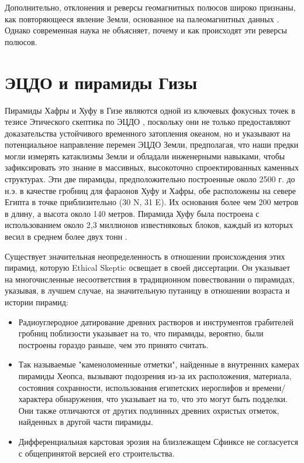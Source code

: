 \documentclass[10pt,twocolumn,letterpaper]{article}
\begin{document}
Дополнительно, отклонения и реверсы геомагнитных полюсов широко признаны, как повторяющееся явление Земли, основанное на палеомагнитных данных \cite{35,40,41}. Однако современная наука не объясняет, почему и как происходят эти реверсы полюсов.

\section{ЭЦДО и пирамиды Гизы}

Пирамиды Хафры и Хуфу в Гизе являются одной из ключевых фокусных точек в тезисе Этического скептика по ЭЦДО \cite{27}, поскольку они не только предоставляют доказательства устойчивого временного затопления океаном, но и указывают на потенциальное направление перемен ЭЦДО Земли, предполагая, что наши предки могли измерять катаклизмы Земли и обладали инженерными навыками, чтобы зафиксировать это знание в массивных, высокоточно спроектированных каменных структурах. Эти две пирамиды, предположительно построенные около 2500 г. до н.э. в качестве гробниц для фараонов Хуфу и Хафры, обе расположены на севере Египта в точке приблизительно (30 N, 31 E). Их основания более чем 200 метров в длину, а высота около 140 метров. Пирамида Хуфу была построена с использованием около 2,3 миллионов известняковых блоков, каждый из которых весил в среднем более двух тонн \cite{24, 25}.

Существует значительная неопределенность в отношении происхождения этих пирамид, которую Ethical Skeptic освещает в своей диссертации. Он указывает на многочисленные несоответствия в традиционном повествовании о пирамидах, указывая, в лучшем случае, на значительную путаницу в отношении возраста и истории пирамид:

\begin{flushleft}
\begin{itemize}
    \item Радиоуглеродное датирование древних растворов и инструментов грабителей гробниц поблизости указывает на то, что пирамиды, вероятно, были построены гораздо раньше, чем это принято считать.
    \item Так называемые "каменоломенные отметки", найденные в внутренних камерах пирамиды Хеопса, вызывают подозрения из-за их расположения, материала, состояния сохранности, использования египетских иероглифов и времени/характера обнаружения, что указывает на то, что это могут быть подделки. Они также отличаются от других подлинных древних охристых отметок, найденных в другой части пирамиды.
    \item Дифференциальная карстовая эрозия на близлежащем Сфинксе не согласуется с общепринятой версией его строительства.
\end{itemize}
\end{flushleft}
\end{document}
